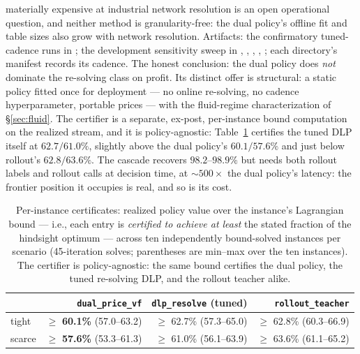 \documentclass[11pt]{article}
\begin{document}
materially expensive at industrial network resolution is an open
operational question, and neither method is granularity-free: the
dual policy's offline fit and table sizes also grow with network
resolution.
Artifacts: the confirmatory tuned-cadence runs in
; the development
sensitivity sweep in ,
,
, , ; each directory's
manifest records its cadence. The
honest conclusion: the dual policy does \emph{not} dominate the
re-solving class on profit. Its distinct offer is structural: a
static policy fitted once for deployment --- no online re-solving, no
cadence hyperparameter, portable prices --- with the fluid-regime
characterization of \S\ref{sec:fluid}. The certifier is a separate,
ex-post, per-instance bound computation on the realized stream, and
it is policy-agnostic: Table~\ref{tab:certs} certifies
the tuned DLP itself at $62.7/61.0\%$, slightly above the dual
policy's $60.1/57.6\%$ and just below rollout's $62.8/63.6\%$. The cascade recovers $98.2$--$98.9\%$ but
needs both rollout labels and rollout calls at decision time, at
${\sim}500\times$ the dual policy's latency: the frontier position it
occupies is real, and so is its cost.

\begin{table}[t]
\centering
\caption{Per-instance certificates: realized policy value over the
instance's Lagrangian bound --- i.e., each entry is \emph{certified to
achieve at least} the stated fraction of the hindsight optimum ---
across ten independently bound-solved instances per scenario
(45-iteration solves; parentheses are min--max over the ten
instances). The certifier is policy-agnostic: the same bound
certifies the dual policy, the tuned re-solving DLP, and the rollout
teacher alike.}
\label{tab:certs}
\small
\begin{tabular}{lrrr}
\toprule
 & \texttt{dual\_price\_vf} & \texttt{dlp\_resolve} (tuned) & \texttt{rollout\_teacher} \\
\midrule
tight & $\geq$ \textbf{60.1\%} (57.0--63.2) & $\geq$ 62.7\% (57.3--65.0) & $\geq$ 62.8\% (60.3--66.9) \\
scarce & $\geq$ \textbf{57.6\%} (53.3--61.3) & $\geq$ 61.0\% (56.1--63.9) & $\geq$ 63.6\% (61.1--65.2) \\
\bottomrule
\end{tabular}
\end{table}
\end{document}
